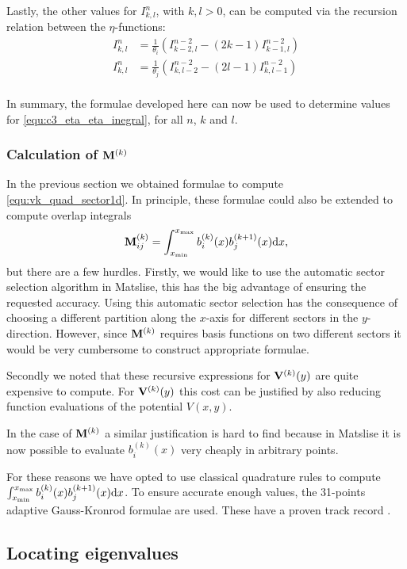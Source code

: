 Lastly, the other values for $I_{k,l}^n$, with $k, l > 0$, can be computed via the recursion relation between the $\eta$-functions:
\begin{align*}
  I_{k, l}^n & = \frac{1}{\theta_i} \left(I_{k-2,l}^{n-2} - (2k - 1) I_{k-1,l}^{n-2}\right) \\
  I_{k, l}^n & = \frac{1}{\theta_j} \left(I_{k,l-2}^{n-2} - (2l - 1) I_{k,l-1}^{n-2}\right) \\
\end{align*}

In summary, the formulae developed here can now be used to determine values for \eqref{equ:c3_eta_eta_inegral}, for all $n$, $k$ and $l$.

\subsubsection{Calculation of \texorpdfstring{$\vb{M}^{(k)}$}{M(k)}}

In the previous section we obtained formulae to compute \eqref{equ:vk_quad_sector1d}. In principle, these formulae could also be extended to compute overlap integrals
$$
  \vb{M}_{ij}^{(k)} = \int_{{x_{\text{min}}}}^{{x_{\text{max}}}}b_i^{(k)}(x)b_j^{(k+1)}(x)\dd x\text{,}
$$
but there are a few hurdles. Firstly, we would like to use the automatic sector selection algorithm in Matslise, this has the big advantage of ensuring the requested accuracy. Using this automatic sector selection has the consequence of choosing a different partition along the $x$-axis for different sectors in the $y$-direction. However, since $\vb{M}^{(k)}$ requires basis functions on two different sectors it would be very cumbersome to construct appropriate formulae.

Secondly we noted that these recursive expressions for $\vb{V}^{(k)}(y)$ are quite expensive to compute. For $\vb{V}^{(k)}(y)$ this cost can be justified by also reducing function evaluations of the potential $V(x, y)$.

In the case of $\vb{M}^{(k)}$ a similar justification is hard to find because in Matslise it is now possible to evaluate $b^{(k)}_i(x)$ very cheaply in arbitrary points.

For these reasons we have opted to use classical quadrature rules to compute $\int_{{x_{\text{min}}}}^{{x_{\text{max}}}}b_i^{(k)}(x)b_j^{(k+1)}(x)\dd x$. To ensure accurate enough values, the 31-points adaptive Gauss-Kronrod formulae are used. These have a proven track record \cite{piessens_quadpack_1983}.


\subsection{Locating eigenvalues}\label{sec:c3_locating_e}

